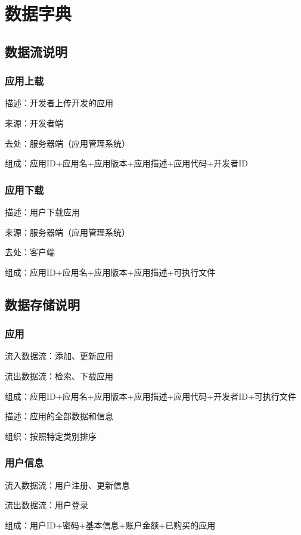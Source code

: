\section{数据字典}
\subsection{数据流说明}
\subsubsection{应用上载}

描述：开发者上传开发的应用

来源：开发者端

去处：服务器端（应用管理系统）

组成：应用ID+应用名+应用版本+应用描述+应用代码+开发者ID

\subsubsection{应用下载}

描述：用户下载应用

来源：服务器端（应用管理系统）

去处：客户端

组成：应用ID+应用名+应用版本+应用描述+可执行文件

\subsection{数据存储说明}
\subsubsection{应用}

流入数据流：添加、更新应用

流出数据流：检索、下载应用

组成：应用ID+应用名+应用版本+应用描述+应用代码+开发者ID+可执行文件

描述：应用的全部数据和信息

组织：按照特定类别排序

\subsubsection{用户信息}

流入数据流：用户注册、更新信息

流出数据流：用户登录

组成：用户ID+密码+基本信息+账户金额+已购买的应用

